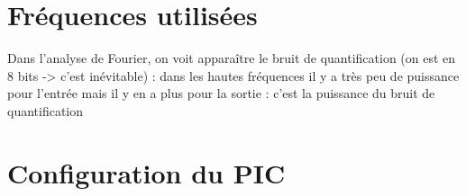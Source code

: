 \documentclass{article}
\begin{document}
    \newpage
    \section{Fréquences utilisées}

    Dans l'analyse de Fourier, on voit apparaître le bruit de quantification (on est en 8 bits -> c'est inévitable) : dans les hautes fréquences il y a très peu de puissance pour l'entrée mais il y en a plus pour la sortie : c'est la puissance du bruit de quantification

    \section{Configuration du PIC}
    \label{section:configuration}



\end{document}
